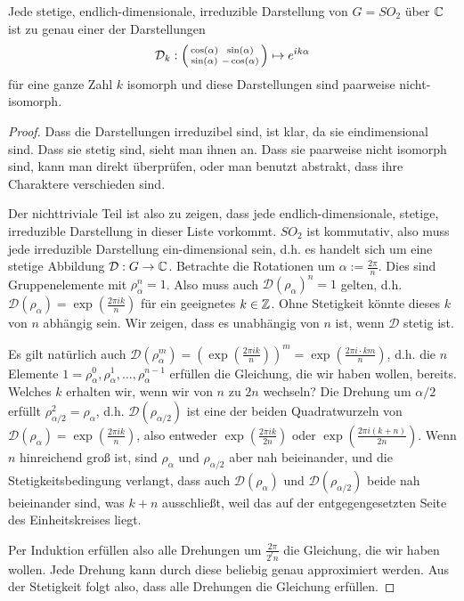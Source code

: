 \begin{theorem}[Darstellungstheorie von $SO_2$ über $\IK=\IC$]
Jede stetige, endlich-dimensionale, irreduzible Darstellung von $G=SO_2$ über $\mathbb{C}$ ist zu genau einer der Darstellungen
\[\mathcal{D}_k : \begin{psmallmatrix}\cos(\alpha)&\sin(\alpha)\\\sin(\alpha)&-\cos(\alpha)\end{psmallmatrix} \mapsto e^{ik\alpha}\]
für eine ganze Zahl $k$ isomorph und diese Darstellungen sind paarweise nicht-isomorph.
\end{theorem}
\begin{proof}
Dass die Darstellungen irreduzibel sind, ist klar, da sie eindimensional sind. Dass sie stetig sind, sieht man ihnen an. Dass sie paarweise nicht isomorph sind, kann man direkt überprüfen, oder man benutzt abstrakt, dass ihre Charaktere verschieden sind.

Der nichttriviale Teil ist also zu zeigen, dass jede endlich-dimensionale, stetige, irreduzible Darstellung in dieser Liste vorkommt. $SO_2$ ist kommutativ, also muss jede irreduzible Darstellung ein-dimensional sein, d.h. es handelt sich um eine stetige Abbildung $\mathcal{D}: G\to\mathbb{C}$. Betrachte die Rotationen um $\alpha:=\frac{2\pi}{n}$. Dies sind Gruppenelemente mit $\rho_\alpha^n=1$. Also muss auch $\mathcal{D}(\rho_\alpha)^n=1$ gelten, d.h. $\mathcal{D}(\rho_\alpha) = \exp(\frac{2\pi i k}{n})$ für ein geeignetes $k\in\mathbb{Z}$. Ohne Stetigkeit könnte dieses $k$ von $n$ abhängig sein. Wir zeigen, dass es unabhängig von $n$ ist, wenn $\mathcal{D}$ stetig ist.

Es gilt natürlich auch $\mathcal{D}(\rho_\alpha^m) = (\exp(\frac{2\pi i k}{n}))^m = \exp(\frac{2\pi i\cdot  km}{n})$, d.h. die $n$ Elemente $1=\rho_\alpha^0, \rho_\alpha^1, \ldots, \rho_\alpha^{n-1}$ erfüllen die Gleichung, die wir haben wollen, bereits. Welches $k$ erhalten wir, wenn wir von $n$ zu $2n$ wechseln? Die Drehung um $\alpha/2$ erfüllt $\rho_{\alpha/2}^2=\rho_\alpha$, d.h. $\mathcal{D}(\rho_{\alpha/2})$ ist eine der beiden Quadratwurzeln von $\mathcal{D}(\rho_\alpha)=\exp(\frac{2\pi i k}{n})$, also entweder $\exp(\frac{2\pi i k}{2n})$ oder $\exp(\frac{2\pi i(k+n)}{2n})$. Wenn $n$ hinreichend groß ist, sind $\rho_\alpha$ und $\rho_{\alpha/2}$ aber nah beieinander, und die Stetigkeitsbedingung verlangt, dass auch $\mathcal{D}(\rho_\alpha)$ und $\mathcal{D}(\rho_{\alpha/2})$ beide nah beieinander sind, was $k+n$ ausschließt, weil das auf der entgegengesetzten Seite des Einheitskreises liegt.

Per Induktion erfüllen also alle Drehungen um $\frac{2\pi}{2^l n}$ die Gleichung, die wir haben wollen. Jede Drehung kann durch diese beliebig genau approximiert werden. Aus der Stetigkeit folgt also, dass alle Drehungen die Gleichung erfüllen.
\end{proof}


